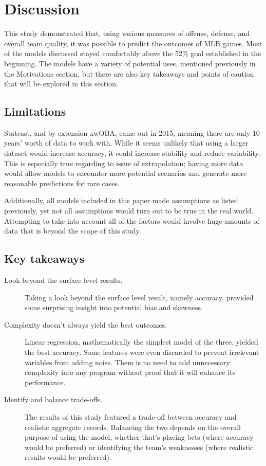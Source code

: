 \documentclass{paper}
\begin{document}
\section{Discussion}
This study demonstrated that, using various measures of offense, defense, and overall team quality, it was possible to predict the outcomes of MLB games. Most of the models discussed stayed comfortably above the 52\% goal established in the beginning. The models have a variety of potential uses, mentioned previously in the Motivations section, but there are also key takeaways and points of caution that will be explored in this section.

\subsection{Limitations}
Statcast, and by extension xwOBA, came out in 2015, meaning there are only 10 years' worth of data to work with. While it seems unlikely that using a larger dataset would increase accuracy, it could increase stability and reduce variability. This is especially true regarding to issue of extrapolation; having more data would allow models to encounter more potential scenarios and generate more reasonable predictions for rare cases.

Additionally, all models included in this paper made assumptions as listed previously, yet not all assumptions would turn out to be true in the real world. Attempting to take into account all of the factors would involve huge amounts of data that is beyond the scope of this study.

\subsection{Key takeaways}
\begin{description}
\item[Look beyond the surface level results.] Taking a look beyond the surface level result, namely accuracy, provided some surprising insight into potential bias and skewness.
\item[Complexity doesn't always yield the best outcomes.] Linear regression, mathematically the simplest model of the three, yielded the best accuracy. Some features were even discarded to prevent irrelevant variables from adding noise. There is no need to add unnecessary complexity into any program without proof that it will enhance its performance.
\item[Identify and balance trade-offs.] The results of this study featured a trade-off between accuracy and realistic aggregate records. Balancing the two depends on the overall purpose of using the model, whether that's placing bets (where accuracy would be preferred) or identifying the team's weaknesses (where realistic results would be preferred).
\end{description}
\end{document}
